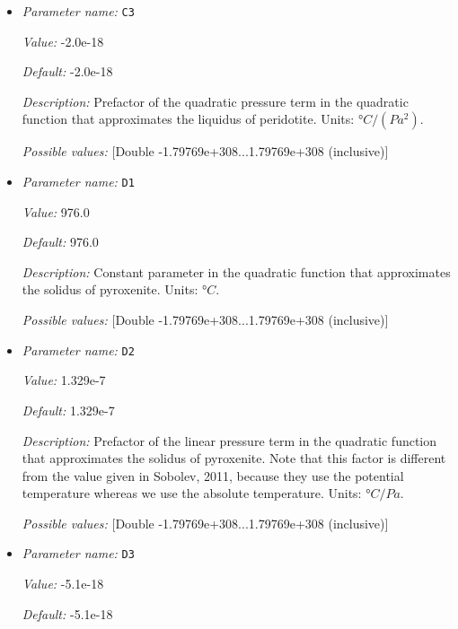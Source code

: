 \begin{itemize}
{\it Possible values:} [Double -1.79769e+308...1.79769e+308 (inclusive)]
\item {\it Parameter name:} {\tt C3}
\label{parameters:Postprocess/Visualization/Melt fraction/C3}


{\it Value:} -2.0e-18


{\it Default:} -2.0e-18


{\it Description:} Prefactor of the quadratic pressure term in the quadratic function that approximates the liquidus of peridotite. Units: $°C/(Pa^2)$.


{\it Possible values:} [Double -1.79769e+308...1.79769e+308 (inclusive)]
\item {\it Parameter name:} {\tt D1}
\label{parameters:Postprocess/Visualization/Melt fraction/D1}


{\it Value:} 976.0


{\it Default:} 976.0


{\it Description:} Constant parameter in the quadratic function that approximates the solidus of pyroxenite. Units: $°C$.


{\it Possible values:} [Double -1.79769e+308...1.79769e+308 (inclusive)]
\item {\it Parameter name:} {\tt D2}
\label{parameters:Postprocess/Visualization/Melt fraction/D2}


{\it Value:} 1.329e-7


{\it Default:} 1.329e-7


{\it Description:} Prefactor of the linear pressure term in the quadratic function that approximates the solidus of pyroxenite. Note that this factor is different from the value given in Sobolev, 2011, because they use the potential temperature whereas we use the absolute temperature. Units: $°C/Pa$.


{\it Possible values:} [Double -1.79769e+308...1.79769e+308 (inclusive)]
\item {\it Parameter name:} {\tt D3}
\label{parameters:Postprocess/Visualization/Melt fraction/D3}


{\it Value:} -5.1e-18


{\it Default:} -5.1e-18



\end{itemize}
